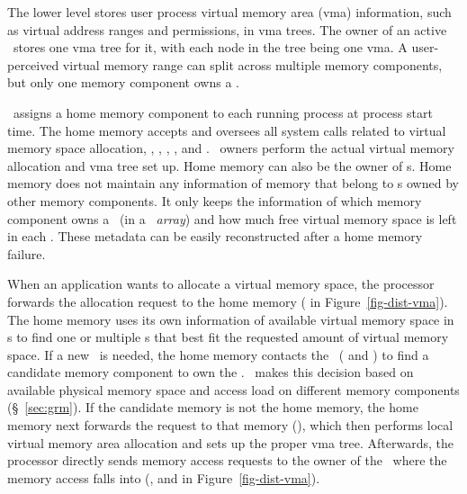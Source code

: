 \documentclass[10pt,times,twocolumn]{z2-article}
\newcommand*\circled[1]{\tikz[baseline=-3pt]{
            \node[shape=circle,draw,inner sep=1pt,minimum size=10pt] (char) {\small #1};}}
\begin{document}
{{{{{{{The lower level stores user process virtual memory area (vma) information,
such as virtual address ranges and permissions, in vma trees.
The owner of an active \vregion\ stores one vma tree for it,
with each node in the tree being one vma.
A user-perceived virtual memory range can split across multiple memory components,
but only one memory component owns a \vregion.

\lego\ assigns a home memory component to each running process at process start time.
The home memory accepts and oversees all system calls related to virtual memory space allocation, 
\eg, \brk, \mmap, \munmap, and \mremap.
\vregion\ owners perform the actual virtual memory allocation and vma tree set up.
Home memory can also be the owner of \vregion{}s.
Home memory does not maintain any information of memory that belong to \vregion{}s owned by other memory components.
It only keeps the information of which memory component owns a \vregion\ (in a {\em \vregion\ array})
and how much free virtual memory space is left in each \vregion.
These metadata can be easily reconstructed after a home memory failure.

When an application wants to allocate a virtual memory space,
the processor forwards the allocation request 
to the home memory (\circled{1} in Figure~\ref{fig-dist-vma}).
The home memory uses its own information of available virtual memory space in \vregion{}s
to find one or multiple \vregion{}s that best fit the requested amount of virtual memory space.
If a new \vregion\ is needed, the home memory contacts the \gmm\ (\circled{2} and \circled{3}) 
to find a candidate memory component to own the \vregion.
\gmm\ makes this decision based on available physical memory space and access load on different memory components (\S~\ref{sec:grm}).
If the candidate memory is not the home memory, the home memory next forwards the request to that memory (\circled{4}),
which then performs local virtual memory area allocation and sets up the proper vma tree. 
Afterwards, the processor directly sends memory access requests to the owner of the \vregion\ where the memory access falls into
(\eg, \circled{a} and \circled{c} in Figure~\ref{fig-dist-vma}).


}}}}}}}
\end{document}
